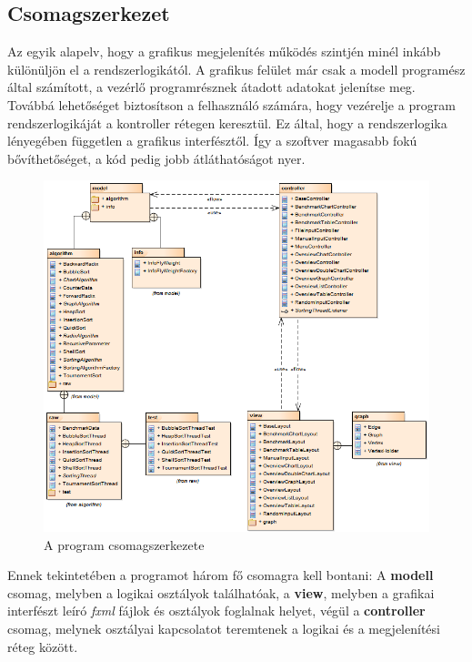 \documentclass{elteikthesis}
\begin{document}
\subsection{Csomagszerkezet}
Az egyik alapelv, hogy a grafikus megjelenítés működés szintjén minél inkább különüljön el a rendszerlogikától. A grafikus felület már csak a modell programész által számított, a vezérlő programrésznek átadott adatokat jelenítse meg. Továbbá lehetőséget biztosítson a felhasználó számára, hogy vezérelje a program rendszerlogikáját a kontroller rétegen keresztül. Ez által, hogy a rendszerlogika lényegében független a grafikus interfésztől. Így a szoftver magasabb fokú bővíthetőséget, a kód pedig jobb átláthatóságot nyer.\par
 \begin{figure}[H]
 	\centering
 	\includegraphics[width=\textwidth]{pics/packagediagram.png}
 	\caption{A program csomagszerkezete}
 \end{figure}\par
Ennek tekintetében a programot három fő csomagra kell bontani: A \textbf{modell} csomag, melyben a logikai osztályok találhatóak, a \textbf{view}, melyben a grafikai interfészt leíró \emph{fxml} fájlok és osztályok foglalnak helyet, végül a \textbf{controller} csomag, melynek osztályai kapcsolatot teremtenek a logikai és a megjelenítési réteg között.
\end{document}
